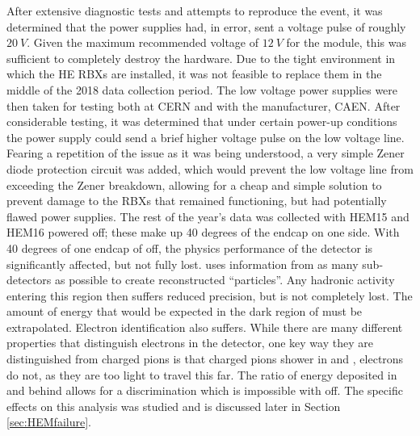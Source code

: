After extensive diagnostic tests and attempts to reproduce the event, it was determined that the power supplies had, in error, sent a voltage pulse of roughly \ensuremath{\SI{20}{V}}. Given the maximum recommended voltage of \ensuremath{\SI{12}{V}} for the module, this was sufficient to completely destroy the hardware. Due to the tight environment in which the HE RBXs are installed, it was not feasible to replace them in the middle of the 2018 data collection period. The low voltage power supplies were then taken for testing both at CERN and with the manufacturer, CAEN. After considerable testing, it was determined that under certain power-up conditions the power supply could send a brief higher voltage pulse on the low voltage line. Fearing a repetition of the issue as it was being understood, a very simple Zener diode protection circuit was added, which would prevent the low voltage line from exceeding the Zener breakdown, allowing for a cheap and simple solution to prevent damage to the RBXs that remained functioning, but had potentially flawed power supplies. The rest of the year's data was collected with HEM15 and HEM16 powered off; these make up 40 degrees of the endcap on one side.  
With 40 degrees of one endcap of \HCAL off, the physics performance of the detector is significantly affected, but not fully lost. \CMS uses information from as many sub-detectors as possible to create reconstructed ``particles''. Any hadronic activity entering this region then suffers reduced precision, but is not completely lost. The amount of energy that would be expected in the dark region of \HCAL must be extrapolated. Electron identification also suffers. While there are many different properties that distinguish electrons in the detector, one key way they are distinguished from charged pions is that charged pions shower in \ECAL and \HCAL, electrons do not, as they are too light to travel this far. The ratio of energy deposited in \ECAL and \HCAL behind allows for a discrimination which is impossible with \HCAL off. The specific effects on this analysis was studied and is discussed later in Section \ref{sec:HEMfailure}.




